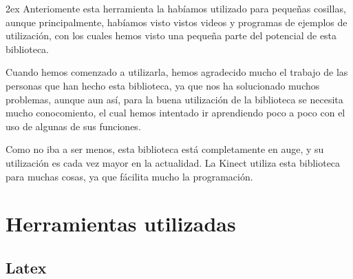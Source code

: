 \documentclass[12pt,a4papert,woside,openright,titlepage,final]{book}
\begin{document}
\parskip 2ex
Anteriomente esta herramienta la habíamos utilizado para pequeñas cosillas,
aunque principalmente, habíamos visto vistos videos y programas de ejemplos de
utilización, con los cuales hemos visto una pequeña parte del potencial de esta
biblioteca. 

Cuando hemos comenzado a utilizarla, hemos agradecido mucho el trabajo de las
personas que han hecho esta biblioteca, ya que nos ha solucionado muchos
problemas, aunque aun así, para la buena utilización de la biblioteca se
necesita mucho conocomiento, el cual hemos intentado ir aprendiendo poco a poco
con el uso de algunas de sus funciones.

Como no iba a ser menos, esta biblioteca está completamente en auge, y su
utilización es cada vez mayor en la actualidad. La Kinect utiliza esta
biblioteca para muchas cosas, ya que fácilita mucho la programación. 

\chapter{Herramientas utilizadas}

\section{Latex}
\end{document}
